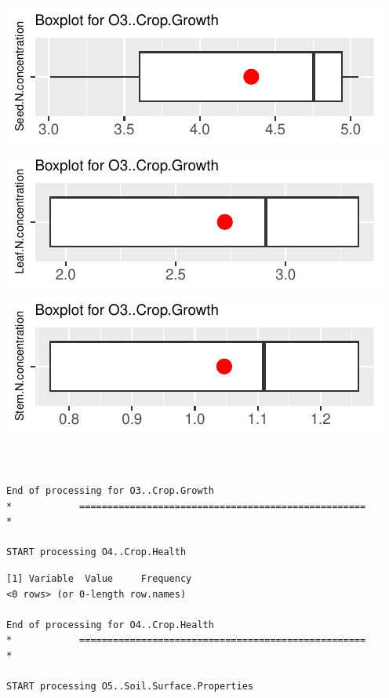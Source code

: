 \documentclass[
]{article}
\begin{document}
\includegraphics{FL_Crop_BMP_QA_single_dataset_files/figure-latex/check-content-of-sheets-48.pdf}
\includegraphics{FL_Crop_BMP_QA_single_dataset_files/figure-latex/check-content-of-sheets-49.pdf}
\includegraphics{FL_Crop_BMP_QA_single_dataset_files/figure-latex/check-content-of-sheets-50.pdf}

\begin{verbatim}


End of processing for O3..Crop.Growth
*            ===================================================            *

START processing O4..Crop.Health
\end{verbatim}

\begin{verbatim}
[1] Variable  Value     Frequency
<0 rows> (or 0-length row.names)

End of processing for O4..Crop.Health
*            ===================================================            *

START processing O5..Soil.Surface.Properties
\end{verbatim}
\end{document}
